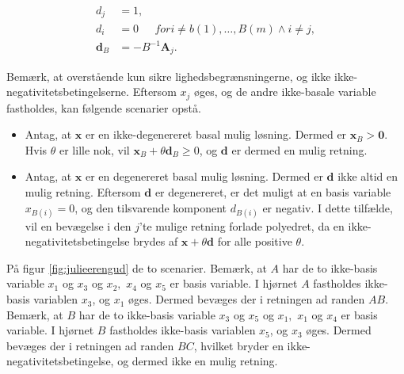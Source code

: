 {\begin{defn}{}{}
%
\begin{align*}
d_j & = 1, \\
d_i & = 0 \phantom{hej} for i \neq b(1), \ldots , B(m) \wedge i \neq j, \\
\mathbf{d}_B & = - B^{-1} \mathbf{A}_j.
\end{align*}
% 
\end{defn}
\noindent
%
Bemærk, at overstående kun sikre lighedsbegrænsningerne, og ikke ikke-negativitetsbetingelserne. 
Eftersom $x_j$ øges, og de andre ikke-basale variable fastholdes, kan følgende scenarier opstå. 
\begin{itemize}
\item Antag, at $\mathbf{x}$ er en ikke-degenereret basal mulig løsning. 
Dermed er $\mathbf{x}_B > \mathbf{0}$. 
Hvis $\theta$ er lille nok, vil $\mathbf{x}_B + \theta \mathbf{d}_B \geq 0 $, og $\mathbf{d}$ er dermed en mulig retning. 
\item Antag, at $\mathbf{x}$ er en degenereret basal mulig løsning. 
Dermed er $\mathbf{d}$ ikke altid en mulig retning. 
Eftersom $\mathbf{d}$ er degenereret, er det muligt at en basis variable $x_{B(i)}=0$, og den tilsvarende komponent $d_{B(i)}$ er negativ. 
I dette tilfælde, vil en bevægelse i den $j$'te mulige retning forlade polyedret, da en ikke-negativitetsbetingelse brydes af $\mathbf{x} + \theta \mathbf{d}$ for alle positive $\theta$. 
\end{itemize}
%
På figur \ref{fig:julieerengud} de to scenarier. 
Bemærk, at $A$ har de to ikke-basis variable $x_1$ og $x_3$ og $x_2,$ $x_4$ og $x_5$ er basis variable.
I hjørnet $A$ fastholdes ikke-basis variablen $x_3$, og $x_1$ øges. 
Dermed bevæges der i retningen ad randen $AB$. 
Bemærk, at $B$ har de to ikke-basis variable $x_3$ og $x_5$ og $x_1,$ $x_1$ og $x_4$ er basis variable.
I hjørnet $B$ fastholdes ikke-basis variablen $x_5$, og $x_3$ øges. 
Dermed bevæges der i retningen ad randen $BC$, hvilket bryder en ikke-negativitetsbetingelse, og dermed ikke en mulig retning. 
}
%
